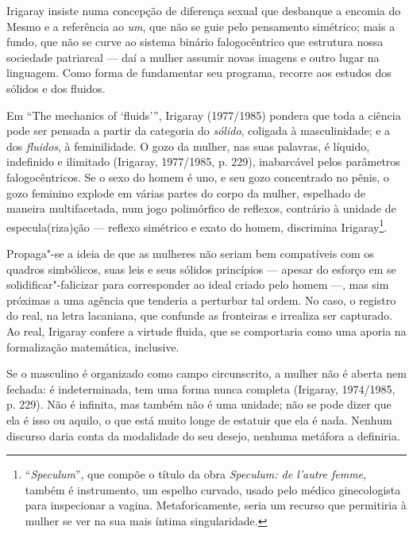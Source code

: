 Irigaray insiste numa concepção de diferença sexual que desbanque a
encomia do Mesmo e a referência ao \emph{um}, que não se guie pelo
pensamento simétrico; mais a fundo, que não se curve ao sistema binário
falogocêntrico que estrutura nossa sociedade patriarcal --- daí a mulher
assumir novas imagens e outro lugar na linguagem. Como forma de
fundamentar seu programa, recorre aos estudos dos sólidos e dos fluidos.

Em ``The mechanics of `fluids''', Irigaray (1977/1985) pondera que toda
a ciência pode ser pensada a partir da categoria do \emph{sólido},
coligada à masculinidade; e a dos \emph{fluidos}, à feminilidade. O gozo
da mulher, nas suas palavras, é líquido, indefinido e ilimitado
(Irigaray, 1977/1985, p. 229), inabarcável pelos parâmetros
falogocêntricos. Se o sexo do homem é uno, e seu gozo concentrado no
pênis, o gozo feminino explode em várias partes do corpo da mulher,
espelhado de maneira multifacetada, num jogo polimórfico de reflexos,
contrário à unidade de especula(riza)ção --- reflexo simétrico e exato
do homem, discrimina Irigaray\footnote{``\emph{Speculum}'', que compõe o
  título da obra \emph{Speculum: de l'autre femme}, também é
  instrumento, um espelho curvado, usado pelo médico ginecologista para
  inspecionar a vagina. Metaforicamente, seria um recurso que permitiria
  à mulher se ver na sua mais íntima singularidade.}.

Propaga"-se a ideia de que as mulheres não seriam bem compatíveis com os
quadros simbólicos, suas leis e seus sólidos princípios --- apesar do
esforço em se solidificar"-falicizar para corresponder ao ideal criado
pelo homem ---, mas sim próximas a uma agência que tenderia a perturbar
tal ordem. No caso, o registro do real, na letra lacaniana, que confunde
as fronteiras e irrealiza ser capturado. Ao real, Irigaray confere a
virtude fluida, que se comportaria como uma aporia na formalização
matemática, inclusive.

Se o masculino é organizado como campo circunscrito, a mulher não é
aberta nem fechada: é indeterminada, tem uma forma nunca completa
(Irigaray, 1974/1985, p. 229). Não é infinita, mas também não é uma
unidade; não se pode dizer que ela é isso ou aquilo, o que está muito
longe de estatuir que ela é nada. Nenhum discurso daria conta da
modalidade do seu desejo, nenhuma metáfora a definiria.

